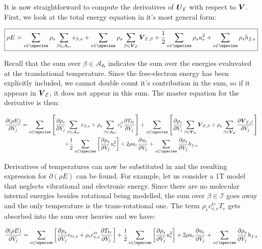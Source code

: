 \documentclass[10pt]{article}
\begin{document}
\begin{flushleft}
It is now straightforward to compute the derivatives of $\boldsymbol{U}_{\mathcal{E}}$ with respect to $\boldsymbol{V}$. First, we look at the total energy equation in it's most general form:

\begin{equation}
    \boxed{\rho E = \sum_{s \in \species} \rho_s 
    \sum_{\beta \in \mathcal{A}_{tr}} e_{\beta,s} + \sum_{s \in \species} \rho_s \sum_{\beta \in \bigV_{\mathcal{E}}} \bigV_{\mathcal{E}, \beta} + \frac{1}{2} \sum_{s \in \species} \rho_s u_r^2 + \sum_{s \in \species} \rho_s h_{f,s}}
\end{equation}

Recall that the sum over $\beta \in \mathcal{A_{tr}}$ indicates the sum over the energies evaluvated at the translational temperature. Since the free-electron energy has been explicitly included, we cannot double count it's contribution in the sum, so if it appears in $\boldsymbol{V}_\mathcal{E}$, it does not appear in this sum. The master equation for the derivative is then:

\begin{multline}
    \pd{(\rho E)}{V_j} = \sum_{s \in \species} \bb{\pd{\rho_s}{V_j} \sum_{\beta \in \mathcal{A}_{tr}} e_{\beta,s} + \rho_s \sum_{\beta \in \mathcal{A}_{tr}} c_v^\beta \pd{T_{tr}}{V_j}} + \sum_{s \in \species} \bb{\pd{\rho_s}{V_j} \sum_{\beta \in \bigV_{\mathcal{E}}} \bigV_{\mathcal{E}, \beta} + \rho_s \sum_{\beta \in \bigV_{\mathcal{E}}} \pd{\bigV_{\mathcal{E}, \beta}}{V_j}}
    \\ +  \frac{1}{2} \sum_{s \in \species} \bb{\pd{\rho_s}{V_j} u_r^2} + 2 \rho u_r \pd{u_r}{V_j}   + \sum_{s \in \species} \pd{\rho_s}{V_j} h_{f,s}
\end{multline}

Derivatives of temperatures can now be substituted in and the resulting expression for $\partial (\rho E)$ can be found. For example, let us consider a 1T model that neglects vibrational and electronic energy. Since there are no molecular internal energies besides rotational being modelled, the sum over $\beta \in \mathcal{I}$ goes away and the only temperature is the trans-rotational one. The term $\rho_e c_{v,e}^{tr} T_e$ gets absorbed into the sum over heavies and we have:

\begin{equation*}
    \pd{(\rho E)}{V_j} = \sum_{s \in \species} \bb{\pd{\rho_s}{V_j} e_{tr,s} + \rho_s c_{v,s}^{tr} \pd{T_{tr}}{V_j}} + \frac{1}{2} \sum_{s \in \species} \bb{\pd{\rho_s}{V_j} u_r^2} + 2 \rho u_r \pd{u_r}{V_j} + \sum_{s \in \species} \pd{\rho_s}{V_j} h_{f,s}
\end{equation*}


\end{flushleft}
\end{document}
